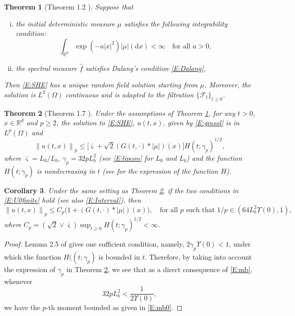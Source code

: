 \documentclass[12pt]{report}
\theoremstyle{plain}
\newtheorem{theorem}{Theorem}[section]
\newtheorem{corollary}[theorem]{Corollary}
\theoremstyle{definition}
\numberwithin{equation}{section}
\newcommand{\R}{\mathbb{R}}
\newcommand{\Norm}[1]{\left\|  #1   \right\|}
\newcommand{\ud}{\ensuremath{ \mathrm{d} }}
\begin{document}
\begin{theorem}[Theorem 1.2 \cite{chen.huang:19:comparison}] \label{T:Solve}
	Suppose that
	\begin{enumerate}[(i)]
		\item the initial deterministic measure $\mu$ satisfies
		the following integrability condition:
		\begin{equation} \label{A:icon}
		\int_{\R^d}\exp\left(-a|x|^2\right) |\mu|(\ud x) < \infty \quad \text{for all $a>0$},
		\end{equation}
		\item the spectral measure $\widehat{f}$ satisfies {\it Dalang's condition} \eqref{E:Dalang},
	\end{enumerate}
	Then \eqref{E:SHE} has a unique random field solution starting from $\mu$. Moreover, the solution
	is $L^2(\Omega)$ continuous and is adapted to the filtration $\{\mathcal{F}_t\}_{t\ge 0}$.
\end{theorem}

\begin{theorem}[Theorem 1.7 \cite{chen.huang:19:comparison}] \label{T:ExUn}
	Under the assumptions of Theorem \ref{T:Solve}, for any $t>0$, $x \in \R^d$ and $p \ge 2$, the
	solution to \eqref{E:SHE}, $u(t,x)$, given by \eqref{E:gmsol} is in $L^p(\Omega)$ and
	\begin{equation} \label{E:mb}
	\Norm{u(t,x)}_p \le \big[\bar{\varsigma}+\sqrt{2}(G(t,\cdot) * |\mu|)(x)\big]H(t;\gamma_p)^{1/2},
	\end{equation}
	where $\bar{\varsigma}=L_0/L_b$, $\gamma_p = 32pL_b^2$ (see \eqref{E:lipcon} for $L_0$ and $L_b$)
	and the function $H(t;\gamma_p)$ is nondecreasing in $t$ (see \cite{chen.huang:19:comparison} for
	the expression of the function $H$).
\end{theorem}

\begin{corollary} \label{C:Mom}
	Under the same setting as Theorem \ref{T:ExUn}, if the two conditions in \eqref{E:U0finite} hold
	(see also \eqref{E:Interval}), then
	\begin{equation} \label{E:mb0}
	\Norm{u(t,x)}_p \le C_p\bigg(1+ (G(t, \cdot)*|\mu|)(x) \bigg),
	\quad \text{for all $p$ such that } 1/p \in \left(64 L_b^2\Upsilon(0),1\right),
	\end{equation}  
	where $C_p=\left(\sqrt{2}\vee \overline{\varsigma}\right)\sup_{t\ge 0}
	H(t;\gamma_p)^{1/2}<\infty$.
\end{corollary}
\begin{proof}
	Lemma 2.5 of \cite{chen.kim:19:nonlinear} gives one sufficient condition, namely,
	$2\gamma_p\Upsilon(0)<1$, under which the function $H((t;\gamma_p)$ is bounded in $t$. Therefore,
	by taking into account the expression of $\gamma_p$ in Theorem \ref{T:ExUn}, we see that as a
	direct consequence of \eqref{E:mb}, whenever
	\begin{equation}\label{E:pLip}
	32 p L_b^2 < \frac{1}{2\Upsilon(0)}, 
	\end{equation}
	we have the $p$-th moment bounded as given in \eqref{E:mb0}.
\end{proof}
\end{document}
